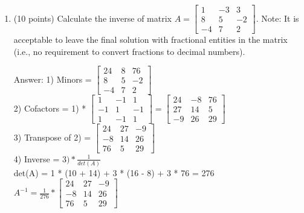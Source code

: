 \documentclass{article}%
\begin{document}
\begin{enumerate}
   \item (10 points) Calculate the inverse of matrix $A =  \begin{bmatrix}  1 & -3 & 3 \\ 8 & 5 & -2 \\ -4 & 7 & 2\end{bmatrix}$. Note: It is acceptable to leave the final solution with fractional entities in the matrix (i.e., no requirement to convert fractions to decimal numbers).\vspace{2ex}


    Answer: 1) Minors = $\begin{bmatrix} 24 & 8 & 76 \\ 8 & 5 & -2 \\ -4 & 7 & 2 \end{bmatrix}$ \\
    2) Cofactors = 1) * $\begin{bmatrix} 1 & -1 & 1 \\ -1 & 1 & -1 \\ 1 & -1 & 1 \end{bmatrix} = \begin{bmatrix} 24 & -8 & 76 \\ 27 & 14 & 5 \\ -9 & 26 & 29 \end{bmatrix}$ \\
    3) Transpose of 2) = $\begin{bmatrix} 24 & 27 & -9 \\ -8 & 14 & 26 \\ 76 & 5 & 29 \end{bmatrix}$ \\
    4) Inverse = $3) * \frac{1}{det(A)}$ \\
    det(A) = 1 * (10 + 14) + 3 * (16 - 8) + 3 * 76 = 276 \\
    $A^{-1} = \frac{1}{276} * \begin{bmatrix} 24 & 27 & -9 \\ -8 & 14 & 26 \\ 76 & 5 & 29 \end{bmatrix}$
    
\end{enumerate}
\end{document}
